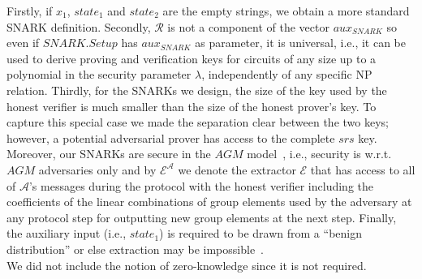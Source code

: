 \vspace{-0.04in}
\noindent Firstly, if $x_1$, $\mathit{state_1}$ and $\mathit{state_2}$ are the empty strings, we obtain a more standard SNARK definition.
Secondly, $\mathcal{R}$ is not a component of the vector $\mathit{aux_{\mathit{SNARK}}}$ so even if $\mathit{SNARK.Setup}$ has 
$\mathit{aux_{\mathit{SNARK}}}$ as parameter, it is universal, 
i.e., it can be used to derive proving and verification keys for circuits of any size up to a polynomial in the security parameter $\lambda$,   
independently of any specific NP relation. Thirdly, for the SNARKs we design, the size of the key used by the honest verifier is much smaller than the size of the honest prover's key. To capture this special case we made the separation clear between the two keys; however, a potential adversarial prover has access to the complete $\mathit{srs}$ key. 
Moreover, our SNARKs are secure in the $\mathit{AGM}$ model~\cite{AGM_model}, i.e., security is w.r.t. $\mathit{AGM}$ 
adversaries only and by $\mathcal{E}^{\mathcal{A}}$ we denote the 
extractor $\mathcal{E}$ that has access to all of 
$\mathcal{A}$'s messages during the protocol with the honest 
verifier including the coefficients of the linear combinations of 
group elements used by the adversary at any protocol step for outputting new group elements at the next step. Finally, the auxiliary input (i.e., $\mathit{state_1}$) is required to 
be drawn from a ``benign distribution'' or else extraction may be 
impossible~\cite{extractability_limits_1,extractability_limits_2}. \\

\noindent We did not include the notion of zero-knowledge since it is not required.
\vspace{-0.1in}